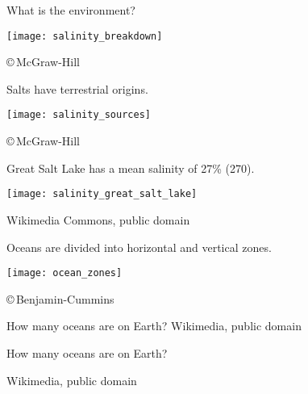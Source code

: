 \documentclass[t]{beamer}
\begin{document}
{
\begin{frame}[t]{What is the  environment?}
\end{frame}
}
\begin{frame}[t]%
	\begin{center}
		\texttt{[image: salinity\_breakdown]}
	\end{center}

	\vfilll

	\hfill \tiny \copyright\,McGraw-Hill
\end{frame}
%
\begin{frame}[t]{Salts have terrestrial origins.}
	\begin{center}
		\texttt{[image: salinity\_sources]}
	\end{center}

	\vfilll

	\hfill \tiny \copyright\,McGraw-Hill
\end{frame}
%
\begin{frame}[t]{Great Salt Lake has a mean salinity of 27\% (270\text{\textperthousand}).}
	\begin{center}
		\texttt{[image: salinity\_great\_salt\_lake]}
	\end{center}

	\tiny Wikimedia Commons, public domain
\end{frame}
%
\begin{frame}[t]{Oceans are divided into horizontal and vertical zones.}
	\begin{center}
		\texttt{[image: ocean\_zones]}
	\end{center}

	\vfilll

	\hfill \tiny \copyright\,Benjamin-Cummins
\end{frame}
%


{
	\begin{frame}[b]{How many oceans are on Earth?}
	\hfill \tiny Wikimedia, public domain
\end{frame}
}
%

{
\begin{frame}[t]{How many oceans are on Earth?}

\vfilll

\hfill \tiny Wikimedia, public domain

\end{frame}
}
%
\end{document}
